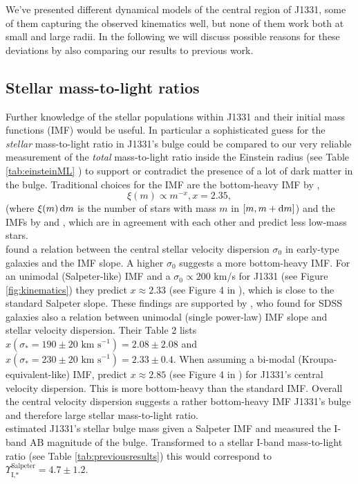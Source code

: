 We've presented different dynamical models of the central region of J1331, some of them capturing the observed kinematics well, but none of them work both at small and large radii. In the following we will discuss possible reasons for these deviations by also comparing our results to previous work.

\subsection{Stellar mass-to-light ratios} \label{sec:MLdiscussion}

Further knowledge of the stellar populations within J1331 and their initial mass functions (IMF) would be useful. In particular a sophisticated guess for the \emph{stellar} mass-to-light ratio in J1331's bulge could be compared to our very reliable measurement of the \emph{total} mass-to-light ratio inside the Einstein radius (see Table \ref{tab:einsteinML} ) to support or contradict the presence of a lot of dark matter in the bulge. Traditional choices for the IMF are the bottom-heavy IMF by \citet{Salpeter1955},
$$\xi(m) \propto m^{-x}, x=2.35,$$
(where $\xi(m) \mathop{}\!\mathrm{d} m$ is the number of stars with mass $m$ in $[m,m+\mathop{}\!\mathrm{d} m]$) and the IMFs by \citet{2002Sci...295...82K} and \citet{Chabrier2003}, which are in agreement with each other and predict less low-mass stars. \\\citet{Ferreras} found a relation between the central stellar velocity dispersion $\sigma_0$ in early-type galaxies and the IMF slope. A higher $\sigma_0$ suggests a more bottom-heavy IMF. For an unimodal (Salpeter-like) IMF and a $\sigma_0 \propto 200 $ km/s for J1331 (see Figure \ref{fig:kinematics}) they predict $x \approx 2.33$ (see Figure 4 in \citet{Ferreras}), which is close to the standard Salpeter slope. These findings are supported by \citet{2014MNRAS.438.1483S}, who found for SDSS galaxies also a relation between unimodal (single power-law) IMF slope and stellar velocity dispersion. Their Table 2 lists $x(\sigma_*=190 \pm 20 \text{ km s}^{-1}) = 2.08 \pm 2.08$ and $x(\sigma_*= 230 \pm 20 \text{ km s}^{-1}) = 2.33 \pm 0.4$. When assuming a bi-modal (Kroupa-equivalent-like) IMF, \citet{Ferreras} predict $x \approx 2.85$ (see Figure 4 in \citet{Ferreras}) for J1331's central velocity dispersion. This is more bottom-heavy than the standard \citet{2002Sci...295...82K} IMF. Overall the central velocity dispersion suggests a rather bottom-heavy IMF J1331's bulge and therefore large stellar mass-to-light ratio.
\\ \citet{SWELLSI} estimated J1331's stellar bulge mass given a Salpeter IMF and measured the I-band AB magnitude of the bulge. Transformed to a stellar I-band mass-to-light ratio (see Table \ref{tab:previousresults}) this would correspond to $\Upsilon_\text{I,*}^\text{Salpeter} = 4.7 \pm 1.2$.
